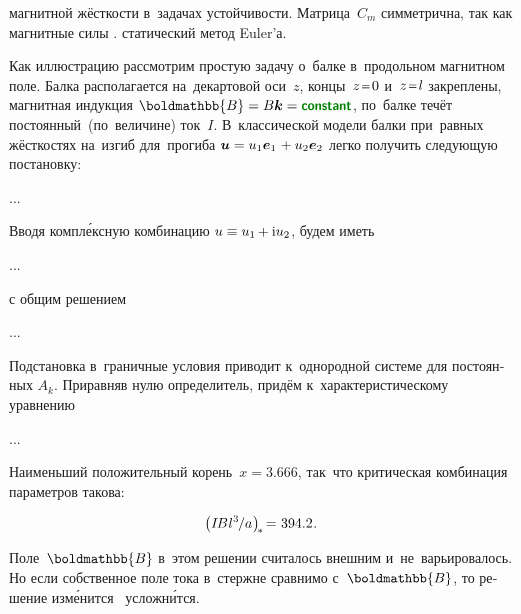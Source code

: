 \begin{otherlanguage}{russian}
магнитной жёсткости
в~задачах устойчивости.
Матрица~$C_m$ симметрична,
так как магнитные силы
.
статический метод Euler’а.

Как иллюстрацию рассмотрим простую задачу о~балке в~продольном магнитном поле.
Балка располагается на~декартовой оси~$z$, концы~${z \narroweq 0}$ и~${z \narroweq l}$ закреплены, магнитная индукция ${\boldmathbb{B} = B\bm{k} = \boldconstant}$, по~балке течёт постоянный~(по~величине) ток~$I$.
В~классической модели балки при~равных жёсткостях на~изгиб для~прогиба ${\bm{u} = u_1 \bm{e}_1 \hspace{.16ex} + u_2 \bm{e}_2}$ легко получить следующую постановку:

...

Вводя компл\'{е}ксную комбинацию
${u \equiv u_1 \hspace{-0.16ex} + \mathrm{i} u_2}$,
будем иметь

...

\noindent
с общим решением

...

\noindent
Подстановка в~граничные условия приводит к~однородной системе для постоянных ${A_k}$.
Приравняв нулю определитель, придём к~характеристическому уравнению

...

\noindent
Наименьший положительный корень~${x = 3.666}$,
так~что критическая комбинация параметров такова:

\noindent\begin{equation*}
\left(
I \hspace{-0.25ex} B \hspace{.1ex} {l^3} \hspace{-0.2ex} / a \hspace{.1ex}
\right)_{\hspace{-0.32ex}*}
\hspace{-0.32ex} = \hspace{.1ex}
394.2
\hspace{.1ex} .
\end{equation*}

Поле~$\boldmathbb{B}$
в~этом решении
считалось внешним
и~не~варьировалось.
Но
если
собственное поле тока
в~стержне
сравнимо
с~$\boldmathbb{B}$,
то решение
изм\'{е}нится
~усложн\'{и}тся.

\end{otherlanguage}

